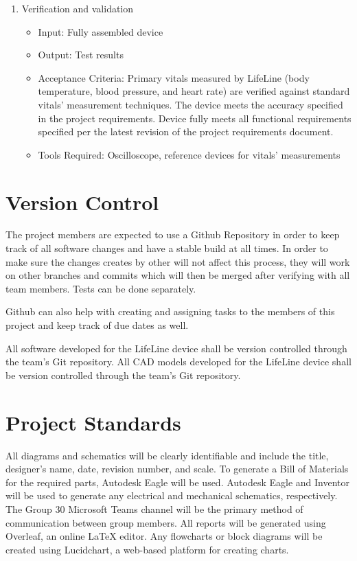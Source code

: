 \documentclass{article}
\begin{document}
\begin{enumerate}
        \item Verification and validation
        \begin{itemize}
            \item Input: Fully assembled device
            \item Output: Test results
            \item Acceptance Criteria: Primary vitals measured by LifeLine (body temperature, blood pressure, and heart rate) are verified against standard vitals' measurement techniques.  The device meets the accuracy specified in the project requirements.  Device fully meets all functional requirements specified per the latest revision of the project requirements document.
            \item Tools Required: Oscilloscope, reference devices for  vitals' measurements
        \end{itemize}
    \end{enumerate}

    \section{Version Control}
    The project members are expected to use a Github Repository in order to keep track of all software changes and have a stable build at all times.  In order to make sure the changes creates by other will not affect this process, they will work on other branches and commits which will then be merged after verifying with all team members.  Tests can be done separately.
    
    Github can also help with creating and assigning tasks to the members of this project and keep track of due dates as well.

    All software developed for the LifeLine device shall be version controlled through the team's Git repository. All CAD models developed for the LifeLine device shall be version controlled through the team's Git repository. 
    \section{Project Standards}
    All diagrams and schematics will be clearly identifiable and include the title, designer's name, date, revision number, and scale. To generate a Bill of Materials for the required parts, Autodesk Eagle will be used. Autodesk Eagle and Inventor will be used to generate any electrical and mechanical schematics, respectively. The Group 30 Microsoft Teams channel will be the primary method of communication between group members.  All reports will be generated using Overleaf, an online LaTeX editor.  Any flowcharts or block diagrams will be created using Lucidchart, a web-based platform for creating charts.
    
\end{document}
